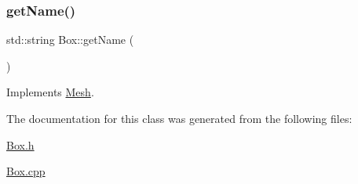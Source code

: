 \subsubsection{\texorpdfstring{getName()}{getName()}}
{\footnotesize\ttfamily std\+::string Box\+::get\+Name (\begin{DoxyParamCaption}{ }\end{DoxyParamCaption})\hspace{0.3cm}{\ttfamily [virtual]}}



Implements \mbox{\hyperlink{class_mesh_aa131fe1c2586fe60988155db77c57272}{Mesh}}.



The documentation for this class was generated from the following files\+:\begin{DoxyCompactItemize}
\item 
\mbox{\hyperlink{_box_8h}{Box.\+h}}\item 
\mbox{\hyperlink{_box_8cpp}{Box.\+cpp}}\end{DoxyCompactItemize}
